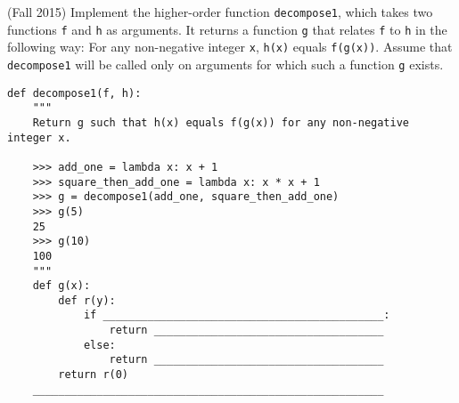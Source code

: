 \begin{blocksection}
\question (Fall 2015) Implement the higher-order function \lstinline$decompose1$, 
which takes two functions \lstinline$f$ and \lstinline$h$ as arguments. It returns a function
\lstinline$g$ that relates \lstinline$f$ to \lstinline$h$ in the following way: For any 
non-negative integer \lstinline$x$, \lstinline$h(x)$ equals \lstinline$f(g(x))$. Assume that 
\lstinline$decompose1$ will be called only on arguments for which such a function 
\lstinline$g$ exists. \\

\begin{lstlisting}
def decompose1(f, h):
    """
    Return g such that h(x) equals f(g(x)) for any non-negative integer x.
    
    >>> add_one = lambda x: x + 1
    >>> square_then_add_one = lambda x: x * x + 1
    >>> g = decompose1(add_one, square_then_add_one)
    >>> g(5)
    25
    >>> g(10)
    100
    """
    def g(x):
        def r(y):
            if ____________________________________________:
                return ____________________________________
            else:
                return ____________________________________
        return r(0)
    _______________________________________________________
    
\end{lstlisting}

\end{blocksection}
